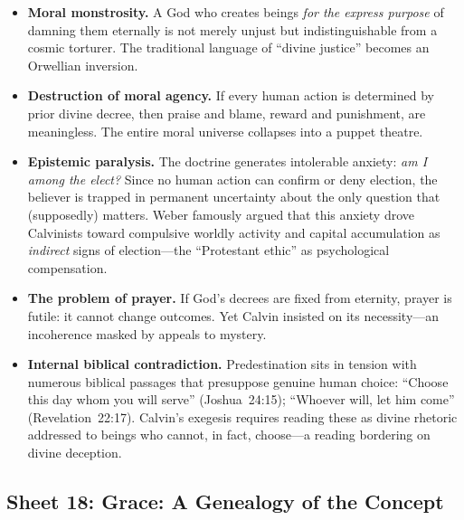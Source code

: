 \begin{itemize}
  \item \textbf{Moral monstrosity.}
    A God who creates beings \emph{for the express purpose} of damning them
    eternally is not merely unjust but indistinguishable from a cosmic
    torturer.  The traditional language of ``divine justice'' becomes an
    Orwellian inversion.

  \item \textbf{Destruction of moral agency.}
    If every human action is determined by prior divine decree, then praise
    and blame, reward and punishment, are meaningless.  The entire moral
    universe collapses into a puppet theatre.

  \item \textbf{Epistemic paralysis.}
    The doctrine generates intolerable anxiety: \emph{am I among the elect?}
    Since no human action can confirm or deny election, the believer is
    trapped in permanent uncertainty about the only question that
    (supposedly) matters.  Weber famously argued that this
    anxiety drove Calvinists toward compulsive worldly activity and
    capital accumulation as \emph{indirect} signs of election---the
    ``Protestant ethic'' as psychological
    compensation.

  \item \textbf{The problem of prayer.}
    If God's decrees are fixed from eternity, prayer is futile: it cannot
    change outcomes.  Yet Calvin insisted on its necessity---an incoherence
    masked by appeals to mystery.

  \item \textbf{Internal biblical contradiction.}
    Predestination sits in tension with numerous biblical passages that
    presuppose genuine human choice:
    ``Choose this day whom you will serve'' (Joshua~24:15);
    ``Whoever will, let him come'' (Revelation~22:17).
    Calvin's exegesis requires reading these as divine rhetoric addressed
    to beings who cannot, in fact, choose---a reading bordering on divine
    deception.
\end{itemize}

\subsection{Sheet 18: Grace: A Genealogy of the Concept}

